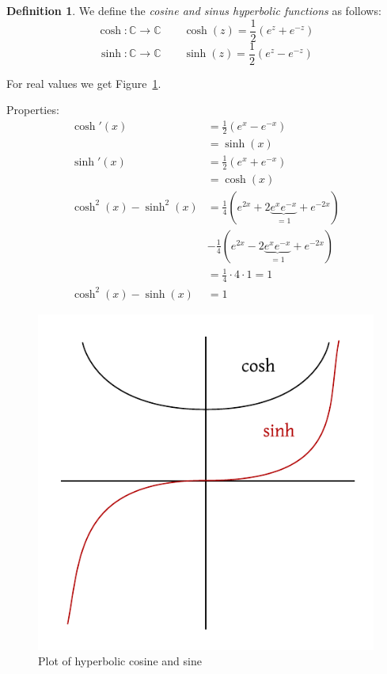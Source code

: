 \documentclass[a4paper,landscape,twocolumn]{article}
\theoremstyle{definition}
\newtheorem{defi}{Definition}
\begin{document}
\begin{defi}
  We define the \emph{cosine and sinus hyperbolic functions} as follows:
  \[ \cosh: \mathbb C \to \mathbb C \qquad \cosh(z) = \frac12 \left(e^z + e^{-z}\right) \]
  \[ \sinh: \mathbb C \to \mathbb C \qquad \sinh(z) = \frac12 \left(e^z - e^{-z}\right) \]

  For real values we get Figure~\ref{img:coshsinh}.

  Properties:
  \begin{align*}
    \cosh'(x) &= \frac12 (e^x - e^{-x}) \\
    &= \sinh(x) \\
    \sinh'(x) &= \frac12 (e^x + e^{-x}) \\
    &= \cosh(x) \\
    \cosh^2(x) - \sinh^2(x) &= \frac14 \left(e^{2x} + 2 \underbrace{e^x e^{-x}}_{=1} + e^{-2x} \right) \\
      & -\frac14 \left(e^{2x} - 2 \underbrace{e^x e^{-x}}_{=1} + e^{-2x}\right) \\
      &= \frac14 \cdot 4 \cdot 1 = 1 \\
    \cosh^2(x) - \sinh(x) &= 1
  \end{align*}
\end{defi}

\begin{figure}[!h]
  \begin{center}
    \includegraphics{img/sinhcosh.pdf}
    \caption{Plot of hyperbolic cosine and sine}
    \label{img:coshsinh}
  \end{center}
\end{figure}
\end{document}
